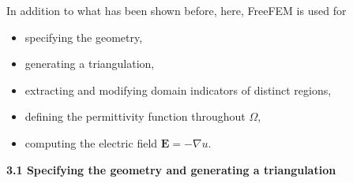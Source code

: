 \documentclass[9pt]{amsart}
\theoremstyle{remark}
\theoremstyle{definition}
\begin{document}
%
In addition to what has been shown before, here, FreeFEM is used for
%
\begin{itemize}
\item specifying the geometry,
\item generating a triangulation,
\item extracting and modifying domain indicators of distinct regions,
\item defining the permittivity function throughout $\varOmega$,
\item computing the electric field $\bm{E}=-\nabla u$.
\end{itemize}

\vspace*{0.2cm}
\textbf{3.1 Specifying the geometry and generating a triangulation}
\end{document}
